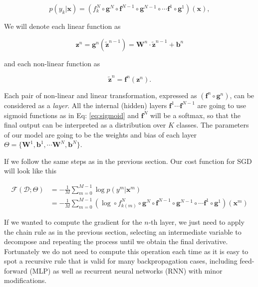 \begin{equation}
p(y_k|\mathbf{x}) = (f_k^N \circ \mathbf{g}^N \circ \mathbf{f}^{N-1} \circ \mathbf{g}^{N-1} \circ \cdots \mathbf{f}^1 \circ \mathbf{g}^1)(\mathbf{x}),
\label{eq:FeedForward}
\end{equation}

\noindent We will denote each linear function as

\begin{equation}
\mathbf{z}^n = \mathbf{g}^n(\tilde{\mathbf{z}}^{n-1}) = \mathbf{W}^n \cdot \tilde{\mathbf{z}}^{n-1} + \mathbf{b}^n 
\end{equation}

\noindent and each non-linear function as 

\begin{equation}
\tilde{\mathbf{z}}^n = \mathbf{f}^n(\mathbf{z}^n).
\end{equation}

Each pair of non-linear and linear transformation, expressed as $(\mathbf{f}^n \circ \mathbf{g}^n)$, can be considered as a \textit{layer}. All the
internal (hidden) layers $\mathbf{f}^1 \cdots \mathbf{f}^{N-1}$ are going to use sigmoid functions as in Eq:
\ref{eq:sigmoid} and $\mathbf{f}^N$ will be a softmax, so that the final output
can be interpreted as a distribution over $K$ classes. The parameters of our
model are going to be the weights and bias of each layer
$\Theta=\{\mathbf{W}^1, \mathbf{b}^1, \cdots \mathbf{W}^N, \mathbf{b}^N\}$.  

If we follow the same steps as in the previous section. Our cost function for
SGD will look like this

\begin{align}
\mathcal{F}(\mathcal{D};\Theta) & = -\frac{1}{M}\sum_{m=0}^{M-1} \log p(y^m | \mathbf{x}^m)\nonumber\\ & = -\frac{1}{M}\sum_{m=0}^{M-1} (\log \circ f_{k(m)}^N \circ \mathbf{g}^N \circ \mathbf{f}^{N-1} \circ \mathbf{g}^{N-1} \circ \cdots \mathbf{f}^1 \circ \mathbf{g}^1)(\mathbf{x}^m)
\end{align}

If we wanted to compute the gradient for the $n$-th layer, we just need to
apply the chain rule as in the previous section, selecting an intermediate variable to decompose  
and repeating the process until we obtain the final derivative. Fortunately we
do not need to compute this operation each time as it is easy to spot a recursive
rule that is valid for many backpropagation cases, including feed-forward
(MLP) as well as recurrent neural networks (RNN) with minor modifications.  

